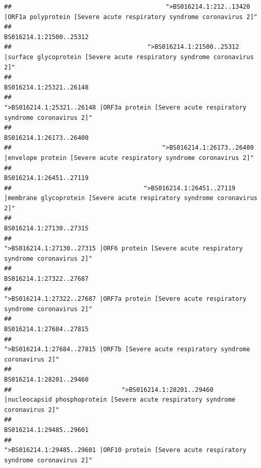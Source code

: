 \documentclass[
]{article}
\begin{document}
\begin{verbatim}
##                                          ">BS016214.1:212..13420 |ORF1a polyprotein [Severe acute respiratory syndrome coronavirus 2]" 
##                                                                                                                BS016214.1:21500..25312 
##                                     ">BS016214.1:21500..25312 |surface glycoprotein [Severe acute respiratory syndrome coronavirus 2]" 
##                                                                                                                BS016214.1:25321..26148 
##                                            ">BS016214.1:25321..26148 |ORF3a protein [Severe acute respiratory syndrome coronavirus 2]" 
##                                                                                                                BS016214.1:26173..26400 
##                                         ">BS016214.1:26173..26400 |envelope protein [Severe acute respiratory syndrome coronavirus 2]" 
##                                                                                                                BS016214.1:26451..27119 
##                                    ">BS016214.1:26451..27119 |membrane glycoprotein [Severe acute respiratory syndrome coronavirus 2]" 
##                                                                                                                BS016214.1:27130..27315 
##                                             ">BS016214.1:27130..27315 |ORF6 protein [Severe acute respiratory syndrome coronavirus 2]" 
##                                                                                                                BS016214.1:27322..27687 
##                                            ">BS016214.1:27322..27687 |ORF7a protein [Severe acute respiratory syndrome coronavirus 2]" 
##                                                                                                                BS016214.1:27684..27815 
##                                                    ">BS016214.1:27684..27815 |ORF7b [Severe acute respiratory syndrome coronavirus 2]" 
##                                                                                                                BS016214.1:28201..29460 
##                              ">BS016214.1:28201..29460 |nucleocapsid phosphoprotein [Severe acute respiratory syndrome coronavirus 2]" 
##                                                                                                                BS016214.1:29485..29601 
##                                            ">BS016214.1:29485..29601 |ORF10 protein [Severe acute respiratory syndrome coronavirus 2]" 

\end{verbatim}
\end{document}
